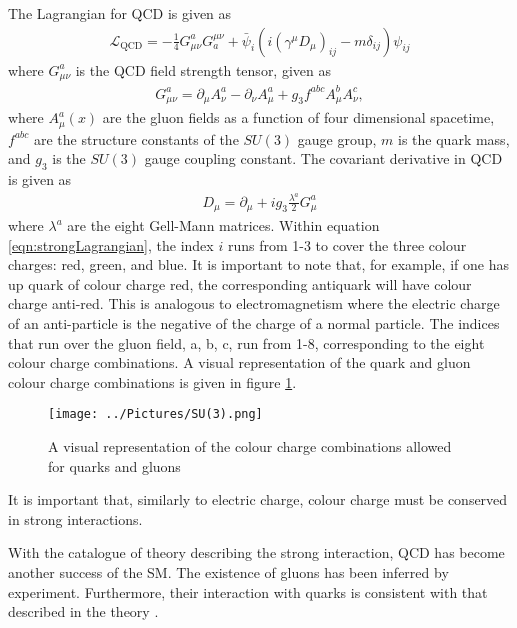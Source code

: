 \documentclass[12pt, oneside]{article}   	%
\begin{document}
The Lagrangian for QCD is given as
\begin{align}
\mathcal{L}_{\textrm{QCD}} = - \frac{1}{4}G^{a}_{\mu \nu} G^{\mu \nu}_{a} + \bar{\psi}_{i}\left(i \left(\gamma^{\mu}D_{\mu}\right)_{ij} - m\delta_{ij}\right)\psi_{ij} 
\label{eqn:strongLagrangian}
\end{align}
where $G^{a}_{\mu \nu}$ is the QCD field strength tensor, given as
\begin{align}
G^{a}_{\mu \nu} = \partial_{\mu} A_{\nu}^{a} - \partial_{\nu} A_{\mu}^{a} + g_{3} f^{abc} A_{\mu}^{b} A_{\nu}^{c},
\end{align}
where $A_{\mu}^{a}(x)$ are the gluon fields as a function of four dimensional spacetime, $f^{abc}$ are the structure constants of the $SU(3)$ gauge group, $m$ is the quark mass, and $g_{3}$ is the $SU(3)$ gauge coupling constant.
The covariant derivative in QCD is given as
\begin{align}
D_{\mu} = \partial_{\mu} + ig_{3} \frac{\lambda^{a}}{2} G_{\mu}^{a}
\end{align}
where $\lambda^{a}$ are the eight Gell-Mann  matrices. 
Within equation \ref{eqn:strongLagrangian}, the index $i$ runs from 1-3 to cover the three colour charges: red, green, and blue.
It is important to note that, for example, if one has up quark of colour charge red, the corresponding antiquark will have colour charge anti-red.
This is analogous to electromagnetism where the electric charge of an anti-particle is the negative of the charge of a normal particle.
The indices that run over the gluon field, a, b, c, run from 1-8, corresponding to the eight colour charge combinations.
A visual representation of the quark and gluon colour charge combinations is given in figure \ref{fig:colourCharge}.

\begin{figure}[H] %
   \centering
   \texttt{[image: ../Pictures/SU(3).png]} 
   \caption{A visual representation of the colour charge combinations allowed for quarks and gluons}
   \label{fig:colourCharge}
\end{figure}

\noindent It is important that, similarly to electric charge, colour charge must be conserved in strong interactions.

With the catalogue of theory describing the strong interaction, QCD has become another success of the SM.
The existence of gluons has been inferred by experiment.
Furthermore, their interaction with quarks is consistent with that described in the theory \cite{brandelik1979evidence}.
\end{document}
